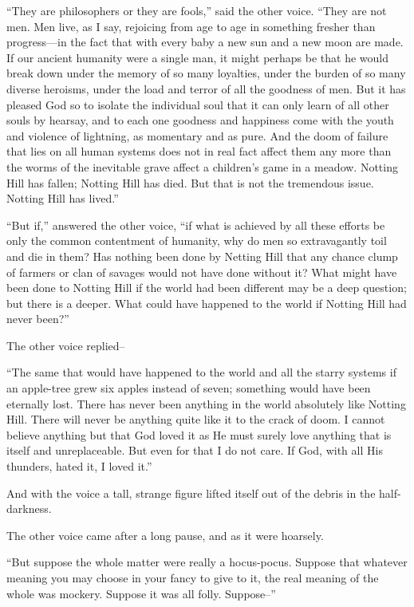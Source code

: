\documentclass{book}
\begin{document}
“They are philosophers or they are fools,” said the other voice. “They are not men. Men live, as I say, rejoicing from age to age in something fresher than progress—in the fact that with every baby a new sun and a new moon are made. If our ancient humanity were a single man, it might perhaps be that he would break down under the memory of so many loyalties, under the burden of so many diverse heroisms, under the load and terror of all the goodness of men. But it has pleased God so to isolate the individual soul that it can only learn of all other souls by hearsay, and to each one goodness and happiness come with the youth and violence of lightning, as momentary and as pure. And the doom of failure that lies on all human systems does not in real fact affect them any more than the worms of the inevitable grave affect a children’s game in a meadow. Notting Hill has fallen; Notting Hill has died. But that is not the tremendous issue. Notting Hill has lived.”

“But if,” answered the other voice, “if what is achieved by all these efforts be only the common contentment of humanity, why do men so extravagantly toil and die in them? Has nothing been done by Netting Hill that any chance clump of farmers or clan of savages would not have done without it? What might have been done to Notting Hill if the world had been different may be a deep question; but there is a deeper. What could have happened to the world if Notting Hill had never been?”

The other voice replied–

“The same that would have happened to the world and all the starry systems if an apple-tree grew six apples instead of seven; something would have been eternally lost. There has never been anything in the world absolutely like Notting Hill. There will never be anything quite like it to the crack of doom. I cannot believe anything but that God loved it as He must surely love anything that is itself and unreplaceable. But even for that I do not care. If God, with all His thunders, hated it, I loved it.”

And with the voice a tall, strange figure lifted itself out of the debris in the half-darkness.

The other voice came after a long pause, and as it were hoarsely.

“But suppose the whole matter were really a hocus-pocus. Suppose that whatever meaning you may choose in your fancy to give to it, the real meaning of the whole was mockery. Suppose it was all folly. Suppose–”
\end{document}
